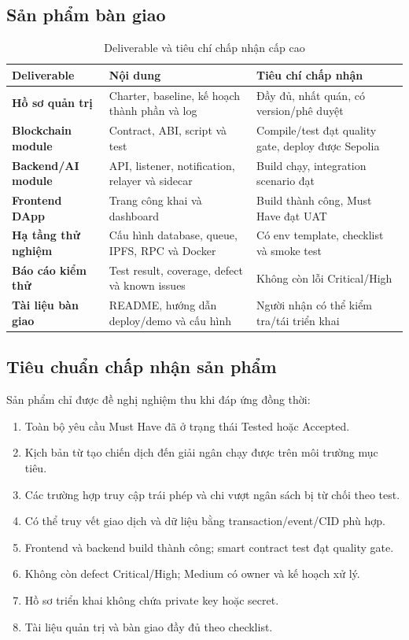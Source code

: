 \subsection{Sản phẩm bàn giao}

\begin{table}[H]
\centering
\caption{Deliverable và tiêu chí chấp nhận cấp cao}
\label{tab:scope-deliverables}
\begin{tabularx}{\textwidth}{| >{\bfseries}p{3.5cm} | p{5.1cm} | X |}
\hline
Deliverable & Nội dung & Tiêu chí chấp nhận \\
\hline
Hồ sơ quản trị & Charter, baseline, kế hoạch thành phần và log & Đầy đủ, nhất quán, có version/phê duyệt \\ \hline
Blockchain module & Contract, ABI, script và test & Compile/test đạt quality gate, deploy được Sepolia \\ \hline
Backend/AI module & API, listener, notification, relayer và sidecar & Build chạy, integration scenario đạt \\ \hline
Frontend DApp & Trang công khai và dashboard & Build thành công, Must Have đạt UAT \\ \hline
Hạ tầng thử nghiệm & Cấu hình database, queue, IPFS, RPC và Docker & Có env template, checklist và smoke test \\ \hline
Báo cáo kiểm thử & Test result, coverage, defect và known issues & Không còn lỗi Critical/High \\ \hline
Tài liệu bàn giao & README, hướng dẫn deploy/demo và cấu hình & Người nhận có thể kiểm tra/tái triển khai \\
\hline
\end{tabularx}
\end{table}

\subsection{Tiêu chuẩn chấp nhận sản phẩm}

Sản phẩm chỉ được đề nghị nghiệm thu khi đáp ứng đồng thời:

\begin{enumerate}
  \item Toàn bộ yêu cầu Must Have đã ở trạng thái Tested hoặc Accepted.
  \item Kịch bản từ tạo chiến dịch đến giải ngân chạy được trên môi trường mục tiêu.
  \item Các trường hợp truy cập trái phép và chi vượt ngân sách bị từ chối theo test.
  \item Có thể truy vết giao dịch và dữ liệu bằng transaction/event/CID phù hợp.
  \item Frontend và backend build thành công; smart contract test đạt quality gate.
  \item Không còn defect Critical/High; Medium có owner và kế hoạch xử lý.
  \item Hồ sơ triển khai không chứa private key hoặc secret.
  \item Tài liệu quản trị và bàn giao đầy đủ theo checklist.
\end{enumerate}

